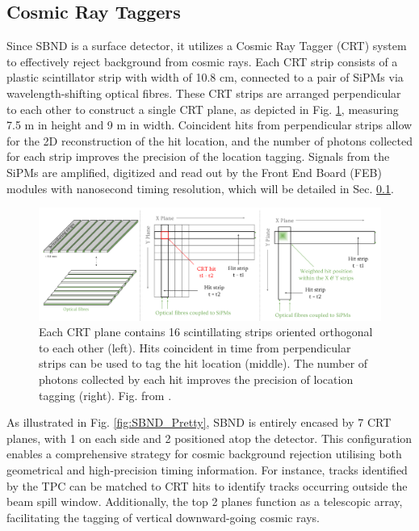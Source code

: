 \subsection{Cosmic Ray Taggers}

Since SBND is a surface detector, it utilizes a Cosmic Ray Tagger (CRT) system to effectively reject background from cosmic rays. 
Each CRT strip consists of a plastic scintillator strip  with width of 10.8 cm, connected to a pair of SiPMs via wavelength-shifting optical fibres.
These CRT strips are arranged perpendicular to each other to construct a single CRT plane, as depicted in Fig. \ref{fig:SBND_CRT}, measuring 7.5 m in height and 9 m in width. 
Coincident hits from perpendicular strips allow for the 2D reconstruction of the hit location, and the number of photons collected for each strip improves the precision of the location tagging.
Signals from the SiPMs are amplified, digitized and read out by the Front End Board (FEB) modules with nanosecond timing resolution, which will be detailed in Sec. \ref{}.

\begin{figure}[htbp] 
\centering    
\includegraphics[width=1.0\textwidth]{SBND_CRT}
\caption[SBND_CRT]{
Each CRT plane contains 16 scintillating strips oriented orthogonal to each other (left).
Hits coincident in time from perpendicular strips can be used to tag the hit location (middle).
The number of photons collected by each hit improves the precision of location tagging (right).
Fig. from \cite{RhiannonPhD}.
}
\label{fig:SBND_CRT}
\end{figure}

As illustrated in Fig. \ref{fig:SBND_Pretty}, SBND is entirely encased by 7 CRT planes, with 1 on each side and 2 positioned atop the detector. 
This configuration enables a comprehensive strategy for cosmic background rejection utilising both geometrical and high-precision timing information.
For instance, tracks identified by the TPC can be matched to CRT hits to identify tracks occurring outside the beam spill window.
Additionally, the top 2 planes function as a telescopic array, facilitating the tagging of vertical downward-going cosmic rays.

